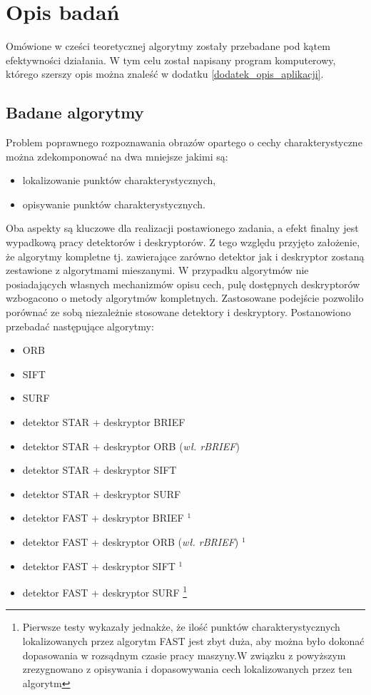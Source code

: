 \chapter{Opis badań}
Omówione w cześci teoretycznej algorytmy zostały przebadane pod kątem efektywności działania.
W tym celu został napisany program komputerowy, którego szerszy opis można znaleść w dodatku \ref{dodatek_opis_aplikacji}.
\FloatBarrier 
\section{Badane algorytmy}
Problem poprawnego rozpoznawania obrazów opartego o cechy charakterystyczne można zdekomponować na dwa mniejsze jakimi są:
\begin{itemize}
\item lokalizowanie punktów charakterystycznych,
\item opisywanie punktów charakterystycznych.
\end{itemize}
Oba aspekty są kluczowe dla realizacji postawionego zadania, a efekt finalny jest wypadkową pracy detektorów i deskryptorów. Z tego względu przyjęto założenie, że algorytmy kompletne tj. zawierające zarówno detektor jak i deskryptor zostaną zestawione z algorytmami mieszanymi. W przypadku algorytmów nie posiadających własnych mechanizmów opisu cech, pulę dostępnych deskryptorów wzbogacono o metody algorytmów kompletnych. Zastosowane podejście pozwoliło porównać ze sobą niezależnie stosowane detektory i deskryptory.
Postanowiono przebadać następujące algorytmy:
\begin{itemize}
\item ORB
\item SIFT
\item SURF
\item detektor STAR + deskryptor BRIEF
\item detektor STAR + deskryptor ORB (\textit{wł. rBRIEF})
\item detektor STAR + deskryptor SIFT
\item detektor STAR + deskryptor SURF
\item detektor FAST + deskryptor BRIEF $^1$
\item detektor FAST + deskryptor ORB (\textit{wł. rBRIEF}) $^1$
\item detektor FAST + deskryptor SIFT $^1$
\item detektor FAST + deskryptor SURF \footnote{Pierwsze testy wykazały jednakże, że ilość punktów charakterystycznych lokalizowanych przez algorytm FAST jest zbyt duża, aby można było dokonać dopasowania w rozsądnym czasie pracy maszyny.W związku z powyższym zrezygnowano z opisywania i dopasowywania cech lokalizowanych przez ten algorytm}
\end{itemize}


